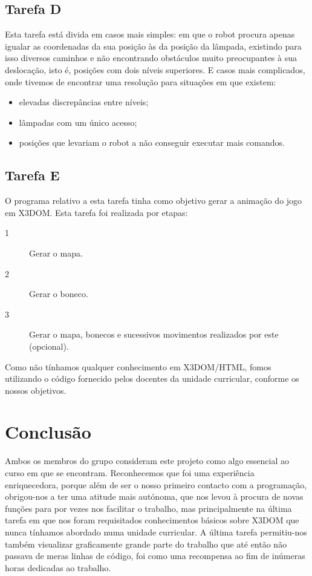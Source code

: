 \documentclass[a4paper,12pt]{report}
\begin{document}
\section{Tarefa D}
Esta tarefa está divida em casos mais simples: em que o robot procura apenas igualar as coordenadas da sua posição às da posição da lâmpada, existindo para isso diversos caminhos e não encontrando obstáculos muito preocupantes à sua deslocação, isto é, posições com dois níveis superiores. E casos mais complicados, onde tivemos de encontrar uma resolução para situações em que existem: 
\begin{itemize}
\item elevadas discrepâncias entre níveis;
\item lâmpadas com um único acesso;
\item posições que levariam o robot a não conseguir executar mais comandos.
\end{itemize}

\section{Tarefa E}
O programa relativo a esta tarefa tinha como objetivo gerar a animação do jogo em \textsc{X3DOM}. Esta tarefa foi realizada por etapas:
\begin{description}
\item[1]Gerar o mapa.
\item[2]Gerar o boneco.
\item[3]Gerar o mapa, bonecos e sucessivos movimentos realizados por este (opcional).

\end{description}
Como não tínhamos qualquer conhecimento em \textsc{X3DOM}/\textsc{HTML}, fomos utilizando o código fornecido pelos docentes da unidade curricular, conforme os nossos objetivos. 

\chapter{Conclusão}
Ambos os membros do grupo consideram este projeto como algo essencial ao curso em que se encontram. Reconhecemos que foi uma experiência enriquecedora, porque além de ser o nosso primeiro contacto com a programação, obrigou-nos a ter uma atitude mais autónoma, que nos levou à procura de novas funções para por vezes nos facilitar o trabalho, mas principalmente na última tarefa em que nos foram requisitados conhecimentos básicos sobre \textsc{X3DOM} que nunca tínhamos abordado numa unidade curricular. 
A última tarefa permitiu-nos também visualizar graficamente grande parte do trabalho que até então não passava de meras linhas de código, foi como uma recompensa ao fim de inúmeras horas dedicadas ao trabalho.
\end{document}
